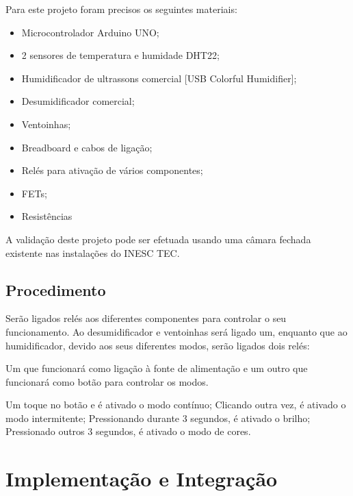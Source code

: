\documentclass[journal]{IEEEtran}
\begin{document}
Para este projeto foram precisos os seguintes materiais:
\begin{itemize}
    \item Microcontrolador Arduino UNO;
    \item 2 sensores de temperatura e humidade DHT22;
    \item Humidificador de ultrassons comercial [USB Colorful Humidifier];
    \item Desumidificador comercial;
    \item Ventoinhas;
    \item Breadboard e cabos de ligação;
    \item Relés para ativação de vários componentes;
    \item FETs;
    \item Resistências
\end{itemize}

A validação deste projeto pode ser efetuada usando uma câmara fechada existente nas instalações do INESC TEC. 

\subsection{Procedimento}

Serão ligados relés aos diferentes componentes para controlar o seu funcionamento. Ao desumidificador e ventoinhas será ligado um, enquanto que ao humidificador, devido aos seus diferentes modos, serão ligados dois relés:

Um que funcionará como ligação à fonte de alimentação e um outro que funcionará como botão para controlar os modos. 

Um toque no botão e é ativado o modo contínuo;
Clicando outra vez, é ativado o modo intermitente;
Pressionando durante 3 segundos, é ativado o brilho;
Pressionado outros 3 segundos, é ativado o modo de cores.









\section{Implementação e Integração}
\end{document}
